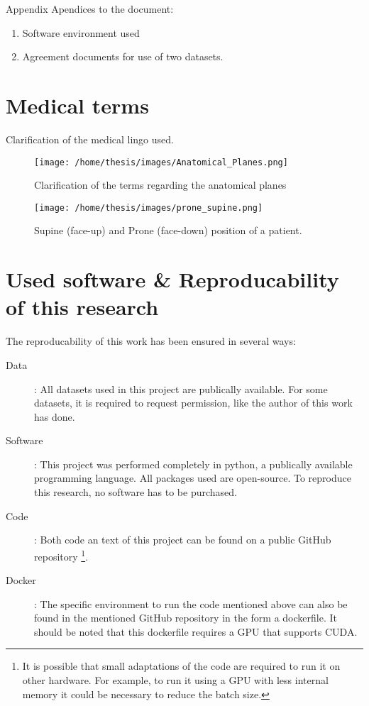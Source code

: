 \appendix

\begin{partwithabstract}{Appendix}
  Apendices to the document:
  \begin{enumerate}
    \item Software environment used
    \item Agreement documents for use of two datasets.
  \end{enumerate}
\end{partwithabstract}
\restoregeometry
\chapter{Medical terms}

Clarification of the medical lingo used.

\begin{SCfigure}[][htb]
  \centering
  \texttt{[image: /home/thesis/images/Anatomical\_Planes.png]}
  \caption{Clarification of the terms regarding the anatomical planes
  }
\end{SCfigure}

\begin{SCfigure}[][htb]
  \centering
  \texttt{[image: /home/thesis/images/prone\_supine.png]}
  \caption{Supine (face-up) and Prone (face-down) position of a patient.}
\end{SCfigure}

\chapter{Used software \& Reproducability of this research}

The reproducability of this work has been ensured in several ways:
\begin{description}
  \item[Data]: All datasets used in this project are publically available. For some datasets, it is required to request permission, like the author of this work has done.
  \item[Software]: This project was performed completely in python, a publically available programming language. 
  All packages used are open-source.
  To reproduce this research, no software has to be purchased. 
  \item[Code]: Both code an text of this project can be found on a public GitHub repository
  \footnote{It is possible that small adaptations of the code are required to run it on other hardware. For example, to run it using a GPU with less internal memory it could be necessary to reduce the batch size.}. 
  \item[Docker]: The specific environment to run the code mentioned above can also be found in the mentioned GitHub repository in the form a dockerfile.
  It should be noted that this dockerfile requires a GPU that supports CUDA.   
\end{description}

